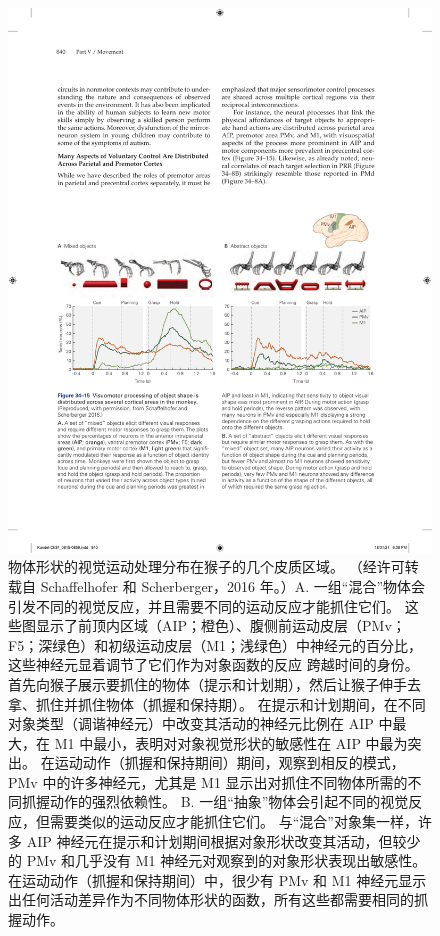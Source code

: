 \begin{figure}[htbp]
	\centering
	\includegraphics[width=0.9\linewidth]{chap34/fig_34_15}
	\caption{物体形状的视觉运动处理分布在猴子的几个皮质区域。 （经许可转载自 Schaffelhofer 和 Scherberger，2016 年。）A. 一组“混合”物体会引发不同的视觉反应，并且需要不同的运动反应才能抓住它们。 这些图显示了前顶内区域（AIP；橙色）、腹侧前运动皮层（PMv；F5；深绿色）和初级运动皮层（M1；浅绿色）中神经元的百分比，这些神经元显着调节了它们作为对象函数的反应 跨越时间的身份。 首先向猴子展示要抓住的物体（提示和计划期），然后让猴子伸手去拿、抓住并抓住物体（抓握和保持期）。 在提示和计划期间，在不同对象类型（调谐神经元）中改变其活动的神经元比例在 AIP 中最大，在 M1 中最小，表明对对象视觉形状的敏感性在 AIP 中最为突出。 在运动动作（抓握和保持期间）期间，观察到相反的模式，PMv 中的许多神经元，尤其是 M1 显示出对抓住不同物体所需的不同抓握动作的强烈依赖性。 B. 一组“抽象”物体会引起不同的视觉反应，但需要类似的运动反应才能抓住它们。 与“混合”对象集一样，许多 AIP 神经元在提示和计划期间根据对象形状改变其活动，但较少的 PMv 和几乎没有 M1 神经元对观察到的对象形状表现出敏感性。 在运动动作（抓握和保持期间）中，很少有 PMv 和 M1 神经元显示出任何活动差异作为不同物体形状的函数，所有这些都需要相同的抓握动作。}
	\label{fig:34_15}
\end{figure}



